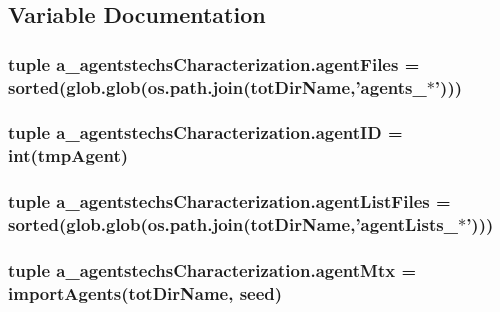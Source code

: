 \subsection{Variable Documentation}
\hypertarget{namespacea__agentstechs_characterization_a1b881f250d738c26411d0f968251f25a}{
\subsubsection[{agent\-Files}]{\setlength{\rightskip}{0pt plus 5cm}tuple a\-\_\-agentstechs\-Characterization.\-agent\-Files = sorted(glob.\-glob(os.\-path.\-join({\bf tot\-Dir\-Name},'agents\-\_\-$\ast$')))}}\label{namespacea__agentstechs_characterization_a1b881f250d738c26411d0f968251f25a}
\hypertarget{namespacea__agentstechs_characterization_af1b083a13ad9299a14d222ca21b56018}{
\subsubsection[{agent\-I\-D}]{\setlength{\rightskip}{0pt plus 5cm}tuple a\-\_\-agentstechs\-Characterization.\-agent\-I\-D = int(tmp\-Agent)}}\label{namespacea__agentstechs_characterization_af1b083a13ad9299a14d222ca21b56018}
\hypertarget{namespacea__agentstechs_characterization_a4ba390eab6e08737d271c5c795f145b4}{
\subsubsection[{agent\-List\-Files}]{\setlength{\rightskip}{0pt plus 5cm}tuple a\-\_\-agentstechs\-Characterization.\-agent\-List\-Files = sorted(glob.\-glob(os.\-path.\-join({\bf tot\-Dir\-Name},'agent\-Lists\-\_\-$\ast$')))}}\label{namespacea__agentstechs_characterization_a4ba390eab6e08737d271c5c795f145b4}
\hypertarget{namespacea__agentstechs_characterization_a80e69ab0323f9f10c85569f737f6ef12}{
\subsubsection[{agent\-Mtx}]{\setlength{\rightskip}{0pt plus 5cm}tuple a\-\_\-agentstechs\-Characterization.\-agent\-Mtx = {\bf import\-Agents}({\bf tot\-Dir\-Name}, seed)}}\label{namespacea__agentstechs_characterization_a80e69ab0323f9f10c85569f737f6ef12}

